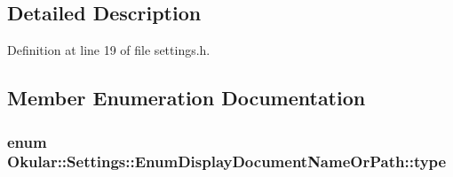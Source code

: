 \subsection{Detailed Description}


Definition at line 19 of file settings.\+h.



\subsection{Member Enumeration Documentation}
\hypertarget{classOkular_1_1Settings_1_1EnumDisplayDocumentNameOrPath_aef0c62073d68d3c208b9a64de8a08fc3}{
\subsubsection[{type}]{\setlength{\rightskip}{0pt plus 5cm}enum {\bf Okular\+::\+Settings\+::\+Enum\+Display\+Document\+Name\+Or\+Path\+::type}}}\label{classOkular_1_1Settings_1_1EnumDisplayDocumentNameOrPath_aef0c62073d68d3c208b9a64de8a08fc3}
